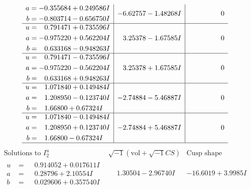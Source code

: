 \documentclass[1p]{elsarticle_modified}
\theoremstyle{definition}
\newcommand{\I}{\sqrt{-1}}
\begin{document}
$$\begin{array}{c|c|c}
\begin{aligned}
a &= -0.355684 + 0.249586 I \\
b &= -0.803714 - 0.656750 I\end{aligned}
 & -6.62757 - 1.48268 I & \phantom{-0.000000 } 0 \\ \hline\begin{aligned}
u &= \phantom{-}0.791471 + 0.735596 I \\
a &= -0.975220 + 0.562204 I \\
b &= \phantom{-}0.633168 - 0.948263 I\end{aligned}
 & \phantom{-}3.25378 - 1.67585 I & \phantom{-0.000000 } 0 \\ \hline\begin{aligned}
u &= \phantom{-}0.791471 - 0.735596 I \\
a &= -0.975220 - 0.562204 I \\
b &= \phantom{-}0.633168 + 0.948263 I\end{aligned}
 & \phantom{-}3.25378 + 1.67585 I & \phantom{-0.000000 } 0 \\ \hline\begin{aligned}
u &= \phantom{-}1.071840 + 0.149484 I \\
a &= \phantom{-}1.208950 - 0.123740 I \\
b &= \phantom{-}1.66800 + 0.67324 I\end{aligned}
 & -2.74884 - 5.46887 I & \phantom{-0.000000 } 0 \\ \hline\begin{aligned}
u &= \phantom{-}1.071840 - 0.149484 I \\
a &= \phantom{-}1.208950 + 0.123740 I \\
b &= \phantom{-}1.66800 - 0.67324 I\end{aligned}
 & -2.74884 + 5.46887 I & \phantom{-0.000000 } 0\\
 \hline 
 \end{array}$$\newpage$$\begin{array}{c|c|c}  
\text{Solutions to }I^u_{2}& \I (\text{vol} + \sqrt{-1}CS) & \text{Cusp shape}\\
 \hline 
\begin{aligned}
u &= \phantom{-}0.914052 + 0.017611 I \\
a &= \phantom{-}0.28796 + 2.10554 I \\
b &= \phantom{-}0.029606 + 0.357540 I\end{aligned}
 & \phantom{-}1.30504 - 2.96740 I & -16.6019 + 3.9985 I \\ \hline\begin{aligned}

\end{aligned}
\end{array}$$
\end{document}
